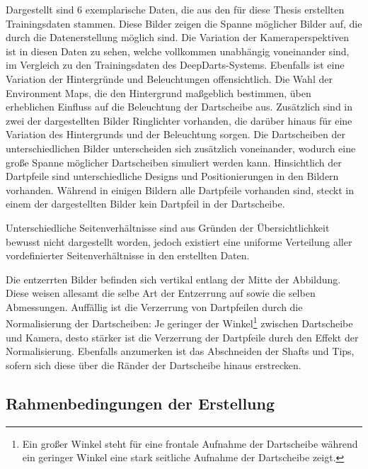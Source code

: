 Dargestellt sind 6 exemplarische Daten, die aus den für diese Thesis erstellten Trainingsdaten stammen. Diese Bilder zeigen die Spanne möglicher Bilder auf, die durch die Datenerstellung möglich sind. Die Variation der Kameraperspektiven ist in diesen Daten zu sehen, welche vollkommen unabhängig voneinander sind, im Vergleich zu den Trainingsdaten des DeepDarts-Systems. Ebenfalls ist eine Variation der Hintergründe und Beleuchtungen offensichtlich. Die Wahl der Environment Maps, die den Hintergrund maßgeblich bestimmen, üben erheblichen Einfluss auf die Beleuchtung der Dartscheibe aus. Zusätzlich sind in zwei der dargestellten Bilder Ringlichter vorhanden, die darüber hinaus für eine Variation des Hintergrunds und der Beleuchtung sorgen. Die Dartscheiben der unterschiedlichen Bilder unterscheiden sich zusätzlich voneinander, wodurch eine große Spanne möglicher Dartscheiben simuliert werden kann. Hinsichtlich der Dartpfeile sind unterschiedliche Designs und Positionierungen in den Bildern vorhanden. Während in einigen Bildern alle Dartpfeile vorhanden sind, steckt in einem der dargestellten Bilder kein Dartpfeil in der Dartscheibe.

Unterschiedliche Seitenverhältnisse sind aus Gründen der Übersichtlichkeit bewusst nicht dargestellt worden, jedoch existiert eine uniforme Verteilung aller vordefinierter Seitenverhältnisse in den erstellten Daten.

Die entzerrten Bilder befinden sich vertikal entlang der Mitte der Abbildung. Diese weisen allesamt die selbe Art der Entzerrung auf sowie die selben Abmessungen. Auffällig ist die Verzerrung von Dartpfeilen durch die Normalisierung der Dartscheiben: Je geringer der Winkel\footnote{Ein großer Winkel steht für eine frontale Aufnahme der Dartscheibe während ein geringer Winkel eine stark seitliche Aufnahme der Dartscheibe zeigt.} zwischen Dartscheibe und Kamera, desto stärker ist die Verzerrung der Dartpfeile durch den Effekt der Normalisierung. Ebenfalls anzumerken ist das Abschneiden der Shafts und Tips, sofern sich diese über die Ränder der Dartscheibe hinaus erstrecken.


\subsection{Rahmenbedingungen der Erstellung}  %
\label{sec:render_info}

